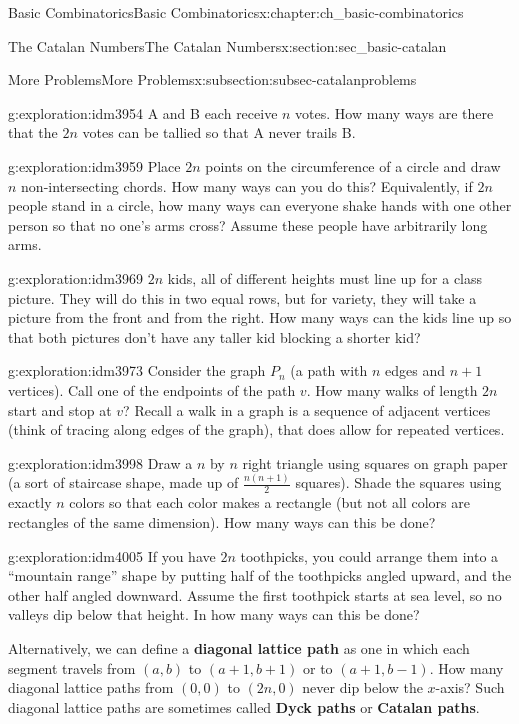 \documentclass[oneside,10pt,]{book}
\newcommand{\terminology}[1]{\textbf{#1}}
\numberwithin{equation}{chapter}
\begin{document}
\begin{chapterptx}{Basic Combinatorics}{}{Basic Combinatorics}{}{}{x:chapter:ch_basic-combinatorics}
\begin{sectionptx}{The Catalan Numbers}{}{The Catalan Numbers}{}{}{x:section:sec_basic-catalan}
\begin{subsectionptx}{More Problems}{}{More Problems}{}{}{x:subsection:subsec-catalanproblems}
\begin{exploration}{}{g:exploration:idm3954}%
A and B each receive \(n\) votes. How many ways are there that the \(2n\) votes can be tallied so that A never trails B.%
\end{exploration}
\begin{exploration}{}{g:exploration:idm3959}%
Place \(2n\) points on the circumference of a circle and draw \(n\)  non-intersecting chords.  How many ways can you do this?  Equivalently, if \(2n\) people stand in a circle, how many ways can everyone shake hands with one other person so that no one's arms cross?  Assume these people have arbitrarily long arms.%
\end{exploration}
\begin{exploration}{}{g:exploration:idm3969}%
\(2n\) kids, all of different heights must line up for a class picture.  They will do this in two equal rows, but for variety, they will take a picture from the front and from the right.  How many ways can the kids line up so that both pictures don't have any taller kid blocking a shorter kid?%
\end{exploration}
\begin{exploration}{}{g:exploration:idm3973}%
Consider the graph \(P_n\) (a path with \(n\) edges and \(n+1\) vertices).  Call one of the endpoints of the path \(v\).  How many walks of length \(2n\) start and stop at \(v\)?  Recall a walk in a graph is a sequence of adjacent vertices (think of tracing along edges of the graph), that does allow for repeated vertices.%
\end{exploration}
\begin{exploration}{}{g:exploration:idm3998}%
Draw a \(n\) by \(n\) right triangle using squares on graph paper (a sort of staircase shape, made up of \(\frac{n(n+1)}{2}\) squares).  Shade the squares using exactly \(n\) colors so that each color makes a rectangle (but not all colors are rectangles of the same dimension).  How many ways can this be done?%
\end{exploration}
\begin{exploration}{}{g:exploration:idm4005}%
If you have \(2n\) toothpicks, you could arrange them into a ``mountain range'' shape by putting half of the toothpicks angled upward, and the other half angled downward.  Assume the first toothpick starts at sea level, so no valleys dip below that height. In how many ways can this be done?%
\par
Alternatively, we can define a \terminology{diagonal lattice path} as one in which each segment travels from \((a,b)\) to \((a+1, b+1)\) or to \((a+1, b-1)\).  How many diagonal lattice paths from \((0,0)\) to \((2n,0)\) never dip below the \(x\)-axis?  Such diagonal lattice paths are sometimes called \terminology{Dyck paths} or \terminology{Catalan paths}.%

\end{exploration}
\end{subsectionptx}
\end{sectionptx}
\end{chapterptx}
\end{document}
